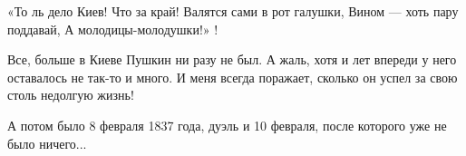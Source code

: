 \begin{zznagolos}
\obeycr
«То ль дело Киев! Что за край!
Валятся сами в рот галушки,
Вином — хоть пару поддавай,
А молодицы-молодушки!» ! 
\restorecr
\end{zznagolos}

Все, больше в Киеве Пушкин ни разу не был. А жаль, хотя и лет впереди у него
оставалось не так-то и много. И меня всегда поражает, сколько он успел за свою
столь недолгую жизнь! 

А потом было 8 февраля 1837 года, дуэль и 10 февраля, после которого уже не
было ничего...
